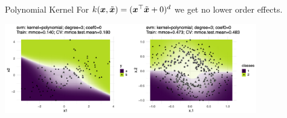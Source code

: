 \begin{vbframe}{Polynomial Kernel}
For $k(\bm{x}, \tilde {\bm{x}}) = (\bm{x}^\top \tilde {\bm{x}} + 0)^d$ we get no lower order effects. 

\vspace*{0.1cm}
\begin{center}
\includegraphics[width = 11cm]{figure_man/polynom_kernel4.png}
\end{center}

\end{vbframe}


\endlecture

